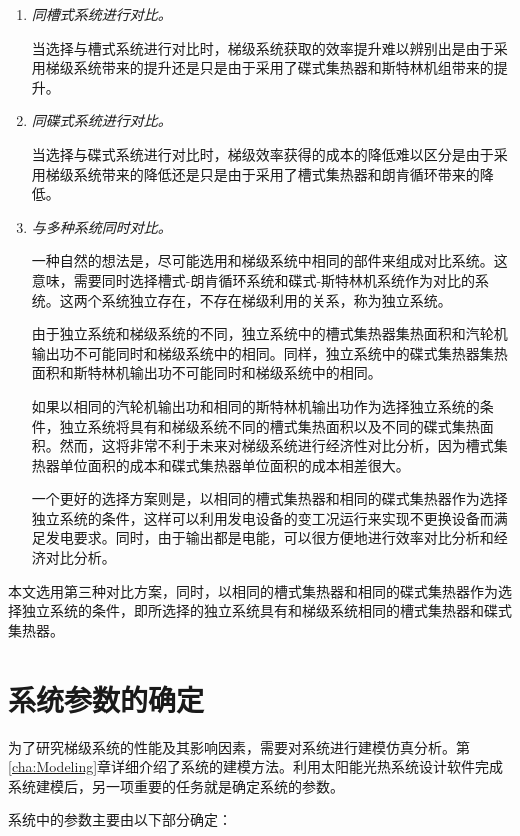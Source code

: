 \begin{enumerate}[label=(\arabic*)]
	\item \emph{同槽式系统进行对比。} 

	\setlength\parindent{2em}当选择与槽式系统进行对比时，梯级系统获取的效率提升难以辨别出是由于采用梯级系统带来的提升还是只是由于采用了碟式集热器和斯特林机组带来的提升。
	\item \emph{同碟式系统进行对比。}
	
	当选择与碟式系统进行对比时，梯级效率获得的成本的降低难以区分是由于采用梯级系统带来的降低还是只是由于采用了槽式集热器和朗肯循环带来的降低。
	\item \emph{与多种系统同时对比。}
	
	一种自然的想法是，尽可能选用和梯级系统中相同的部件来组成对比系统。这意味，需要同时选择槽式-朗肯循环系统和碟式-斯特林机系统作为对比的系统。这两个系统独立存在，不存在梯级利用的关系，称为独立系统。
	
	由于独立系统和梯级系统的不同，独立系统中的槽式集热器集热面积和汽轮机输出功不可能同时和梯级系统中的相同。同样，独立系统中的碟式集热器集热面积和斯特林机输出功不可能同时和梯级系统中的相同。
	
	如果以相同的汽轮机输出功和相同的斯特林机输出功作为选择独立系统的条件，独立系统将具有和梯级系统不同的槽式集热面积以及不同的碟式集热面积。然而，这将非常不利于未来对梯级系统进行经济性对比分析，因为槽式集热器单位面积的成本和碟式集热器单位面积的成本相差很大。
	
	一个更好的选择方案则是，以相同的槽式集热器和相同的碟式集热器作为选择独立系统的条件，这样可以利用发电设备的变工况运行来实现不更换设备而满足发电要求。同时，由于输出都是电能，可以很方便地进行效率对比分析和经济对比分析。
	
\end{enumerate}

本文选用第三种对比方案，同时，以相同的槽式集热器和相同的碟式集热器作为选择独立系统的条件，即所选择的独立系统具有和梯级系统相同的槽式集热器和碟式集热器。

\section{系统参数的确定}

为了研究梯级系统的性能及其影响因素，需要对系统进行建模仿真分析。第\ref{cha:Modeling}章详细介绍了系统的建模方法。利用太阳能光热系统设计软件完成系统建模后，另一项重要的任务就是确定系统的参数。

系统中的参数主要由以下部分确定：

